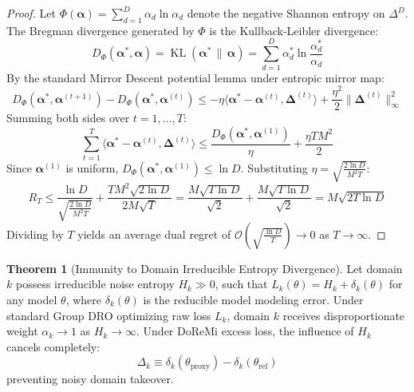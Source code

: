 \documentclass[11pt,a4paper]{article}
\theoremstyle{definition}
\newtheorem{theorem}{\textbf{Theorem}}[section]
\begin{document}
\begin{proof}
Let $\Phi(\boldsymbol{\alpha}) = \sum_{d=1}^D \alpha_d \ln \alpha_d$ denote the negative Shannon entropy on $\Delta^D$. The Bregman divergence generated by $\Phi$ is the Kullback-Leibler divergence:
\begin{equation}
D_{\Phi}(\boldsymbol{\alpha}^*, \boldsymbol{\alpha}) = \operatorname{KL}(\boldsymbol{\alpha}^* \,\|\, \boldsymbol{\alpha}) = \sum_{d=1}^D \alpha_d^* \ln \frac{\alpha_d^*}{\alpha_d}
\end{equation}
By the standard Mirror Descent potential lemma under entropic mirror map:
\begin{equation}
D_{\Phi}(\boldsymbol{\alpha}^*, \boldsymbol{\alpha}^{(t+1)}) - D_{\Phi}(\boldsymbol{\alpha}^*, \boldsymbol{\alpha}^{(t)}) \le -\eta \langle \boldsymbol{\alpha}^* - \boldsymbol{\alpha}^{(t)}, \boldsymbol{\Delta}^{(t)} \rangle + \frac{\eta^2}{2} \|\boldsymbol{\Delta}^{(t)}\|_\infty^2
\end{equation}
Summing both sides over $t = 1, \dots, T$:
\begin{equation}
\sum_{t=1}^T \langle \boldsymbol{\alpha}^* - \boldsymbol{\alpha}^{(t)}, \boldsymbol{\Delta}^{(t)} \rangle \le \frac{D_{\Phi}(\boldsymbol{\alpha}^*, \boldsymbol{\alpha}^{(1)})}{\eta} + \frac{\eta T M^2}{2}
\end{equation}
Since $\boldsymbol{\alpha}^{(1)}$ is uniform, $D_{\Phi}(\boldsymbol{\alpha}^*, \boldsymbol{\alpha}^{(1)}) \le \ln D$. Substituting $\eta = \sqrt{\frac{2 \ln D}{M^2 T}}$:
\begin{equation}
R_T \le \frac{\ln D}{\sqrt{\frac{2 \ln D}{M^2 T}}} + \frac{T M^2 \sqrt{2 \ln D}}{2 M \sqrt{T}} = \frac{M \sqrt{T \ln D}}{\sqrt{2}} + \frac{M \sqrt{T \ln D}}{\sqrt{2}} = M \sqrt{2 T \ln D}
\end{equation}
Dividing by $T$ yields an average dual regret of $\mathcal{O}\left( \sqrt{\frac{\ln D}{T}} \right) \to 0$ as $T \to \infty$.
\end{proof}

\begin{theorem}[Immunity to Domain Irreducible Entropy Divergence]
Let domain $k$ possess irreducible noise entropy $H_k \gg 0$, such that $L_k(\theta) = H_k + \delta_k(\theta)$ for any model $\theta$, where $\delta_k(\theta)$ is the reducible model modeling error. Under standard Group DRO optimizing raw loss $L_k$, domain $k$ receives disproportionate weight $\alpha_k \to 1$ as $H_k \to \infty$. Under DoReMi excess loss, the influence of $H_k$ cancels completely:
{\boldmath
\begin{equation}
\Delta_k \equiv \delta_k(\theta_{\text{proxy}}) - \delta_k(\theta_{\text{ref}})
\end{equation}
}
preventing noisy domain takeover.
\end{theorem}
\end{document}
